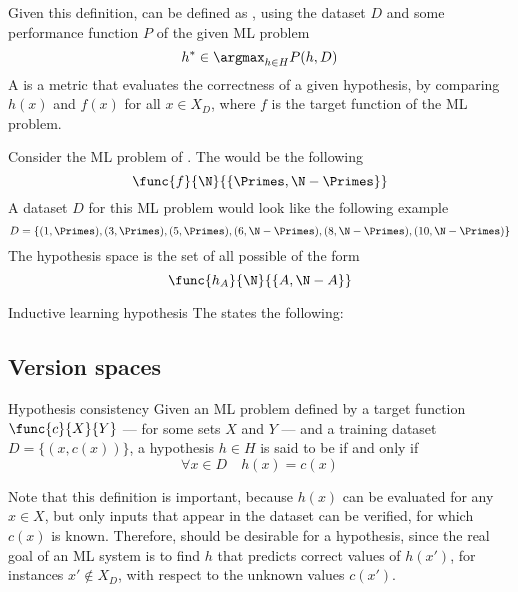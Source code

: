 \documentclass[a4paper, 12pt]{report}
\begin{document}
    Given this definition,  can be defined as , using the dataset $D$ and some performance function $P$ of the given ML problem $$h^* \in \argmax_{h \in H}{P(h, D)}$$ A  is a metric that evaluates the correctness of a given hypothesis, by comparing $h(x)$ and $f(x)$ for all $x \in X_D$, where $f$ is the target function of the ML problem.

    \begin{example}[Hypothesis]
        Consider the ML problem of . The  would be the following $$\func{f}{\N}{\{\Primes, \N - \Primes\}}$$ A dataset $D$ for this ML problem would look like the following example $$D = \{(1, \Primes), (3, \Primes), (5, \Primes), (6, \N - \Primes), (8, \N - \Primes), (10, \N - \Primes)\}$$ The hypothesis space is the set of all possible  of the form $$\func{h_A}{\N}{\{A, \N - A\}}$$
    \end{example}

    \begin{frameddefn}{Inductive learning hypothesis}
        The  states the following: 
    \end{frameddefn}

    \subsection{Version spaces}

    \begin{frameddefn}{Hypothesis consistency}
        Given an ML problem defined by a target function $\func{c}{X}{Y}$ --- for some sets $X$ and $Y$ --- and a training dataset $D = \{(x, c(x))\}$, a hypothesis $h \in H$ is said to be  if and only if $$\forall x \in D \quad h(x) = c(x)$$
    \end{frameddefn}

    Note that this definition is important, because $h(x)$ can be evaluated for any $x \in X$, but only inputs that appear in the dataset can be verified, for which $c(x)$ is known. Therefore,  should be desirable for a hypothesis, since the real goal of an ML system is to find  $h$ that predicts correct values of $h(x')$, for instances $x' \notin X_D$, with respect to the unknown values $c(x')$.
\end{document}
